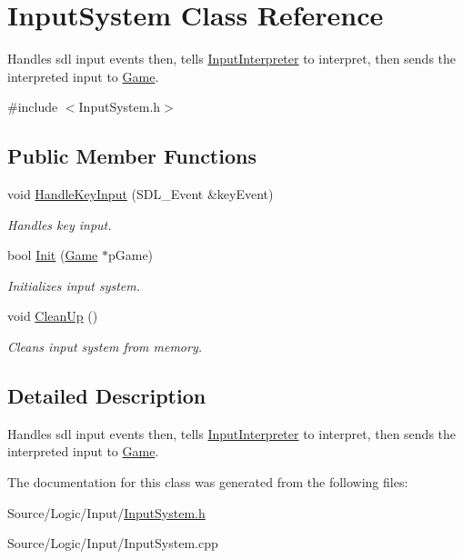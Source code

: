 \hypertarget{class_input_system}{}\section{Input\+System Class Reference}
\label{class_input_system}


Handles sdl input events then, tells \mbox{\hyperlink{class_input_interpreter}{Input\+Interpreter}} to interpret, then sends the interpreted input to \mbox{\hyperlink{class_game}{Game}}.  




{\ttfamily \#include $<$Input\+System.\+h$>$}

\subsection*{Public Member Functions}
\begin{DoxyCompactItemize}
\item 
\mbox{\label{class_input_system_a00623e541ff826b6feea56c06dd662ac}} 
void \mbox{\hyperlink{class_input_system_a00623e541ff826b6feea56c06dd662ac}{Handle\+Key\+Input}} (S\+D\+L\+\_\+\+Event \&key\+Event)
\begin{DoxyCompactList}\small\item\em Handles key input. \end{DoxyCompactList}\item 
\mbox{\label{class_input_system_a10fd1e6d546a9a6d3d6ea46938c0c458}} 
bool \mbox{\hyperlink{class_input_system_a10fd1e6d546a9a6d3d6ea46938c0c458}{Init}} (\mbox{\hyperlink{class_game}{Game}} $\ast$p\+Game)
\begin{DoxyCompactList}\small\item\em Initializes input system. \end{DoxyCompactList}\item 
\mbox{\label{class_input_system_aff8fc30adb0eeba8ffb280ca2460b9ac}} 
void \mbox{\hyperlink{class_input_system_aff8fc30adb0eeba8ffb280ca2460b9ac}{Clean\+Up}} ()
\begin{DoxyCompactList}\small\item\em Cleans input system from memory. \end{DoxyCompactList}\end{DoxyCompactItemize}


\subsection{Detailed Description}
Handles sdl input events then, tells \mbox{\hyperlink{class_input_interpreter}{Input\+Interpreter}} to interpret, then sends the interpreted input to \mbox{\hyperlink{class_game}{Game}}. 

The documentation for this class was generated from the following files\+:\begin{DoxyCompactItemize}
\item 
Source/\+Logic/\+Input/\mbox{\hyperlink{_input_system_8h}{Input\+System.\+h}}\item 
Source/\+Logic/\+Input/Input\+System.\+cpp\end{DoxyCompactItemize}
